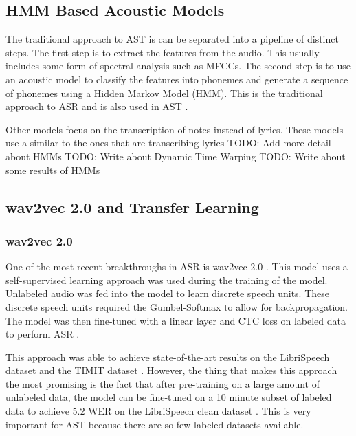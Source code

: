 \documentclass[letterpaper, 12pt]{article}
\begin{document}
\begin{multicols*}{2}
\subsection{HMM Based Acoustic Models}
The traditional approach to AST is can be separated into a pipeline of distinct steps. The first
step is to extract the features from the audio. This usually includes some form of spectral analysis
such as MFCCs. The second step is to use an acoustic model to classify the features into phonemes
and generate a sequence of phonemes using a Hidden Markov Model (HMM). This is the traditional
approach to ASR and is also used in AST \citep{Hansen}.

{
\color{red}
Other models focus on the transcription of notes instead of lyrics. These models use a similar
to the ones that are transcribing lyrics
TODO: Add more detail about HMMs
TODO: Write about Dynamic Time Warping
TODO: Write about some results of HMMs
}


\subsection{wav2vec 2.0 and Transfer Learning} \label{sec:wav2vec}

\subsubsection{wav2vec 2.0}
One of the most recent breakthroughs in ASR is wav2vec 2.0 \citep{wav2vec}. This model uses a
self-supervised learning approach was used during the training of the model. Unlabeled audio was
fed into the model to learn discrete speech units. These discrete speech units required the
Gumbel-Softmax \citep{gumbelSoftmax} to allow for backpropagation. The model was then
fine-tuned with a linear layer and CTC loss on labeled data to perform ASR \citep{wav2vec}.

This approach was able to achieve state-of-the-art results on the LibriSpeech dataset \citep{Librispeech}
and the TIMIT dataset \citep{TIMIT}. However, the thing that makes this approach the most promising
is the fact that after pre-training on a large amount of unlabeled data, the model can be fine-tuned
on a 10 minute subset of labeled data to achieve 5.2 WER on the LibriSpeech clean dataset \citep{wav2vec}.
This is very important for AST because there are so few labeled datasets available.


\end{multicols*}
\end{document}
